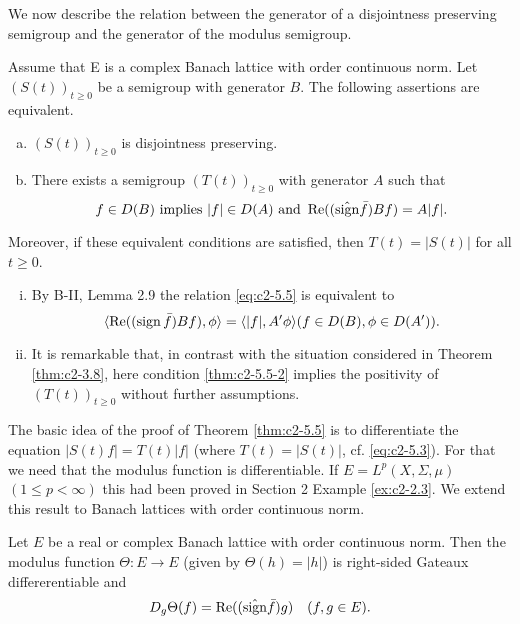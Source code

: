We now describe the relation between the generator of a disjointness preserving semigroup and the generator of the modulus semigroup.

\begin{theorem}\label{thm:c2-5.5}
Assume that E is a complex Banach lattice with order continuous norm. 
Let $(S(t))_{t \geq 0}$ be a semigroup with generator $B$.
The following assertions are equivalent.
\begin{enumerate}[(a)]
\item \label{thm:c2-5.5-1}
$(S(t))_{t \geq 0}$ is disjointness preserving.
\item \label{thm:c2-5.5-2}
There exists a semigroup $(T(t))_{t \geq 0}$ with generator $A$ such
that
\begin{equation}\label{eq:c2-5.5}
f \in D(B) \text{ implies } |f| \in D(A) \text{ and } \mathop{}\!\mathrm{Re}((\hat{\operatorname{sign}}  \bar{f})Bf) = A|f|.
\end{equation}
\end{enumerate}
Moreover, if these equivalent conditions are satisfied, then
$T(t) = |S(t)|$ for all $t \geq 0$.
\end{theorem}

\begin{remark*}
\begin{enumerate}[i)] \label{enum:c2-kgk.1}
\item  \label{enum:c2-kgk.1-1} %
By B-II, Lemma 2.9 
the relation \eqref{eq:c2-5.5} is equivalent to
\[
\langle\mathop{}\!\mathrm{Re}((\operatorname{sign}  \bar{f})Bf),\phi \rangle = \langle|f|,A'\phi\rangle  (f \in D(B), \phi \in D(A')).
\]
\item \label{enum:c2-kgk.1-2}
It is remarkable that, in contrast with the situation considered in
Theorem \ref{thm:c2-3.8}, here condition \ref{thm:c2-5.5-2}  implies the positivity of $(T(t))_{t \geq 0}$
without further assumptions.
\end{enumerate}
\end{remark*}

The basic idea of the proof of Theorem \ref{thm:c2-5.5}   is to differentiate the equation $|S(t)f| = T(t)|f|$ (where $T(t) = |S(t)|$, cf. \eqref{eq:c2-5.3}). For
that we need that the modulus function is differentiable.
If $E = L^{p}(X,\Sigma,\mu)$ $(1 \leq p < \infty)$ this had been proved in Section 2 Example 
\ref{ex:c2-2.3}.
We extend this result to Banach lattices with order continuous norm.

\begin{proposition}\label{prop:c2-5.6}
Let $E$ be a real or complex Banach lattice with order continuous norm. 
Then the modulus function $\Theta \colon E \to E$ (given by $\Theta(h) = |h|$) is right-sided Gateaux differerentiable and
\begin{equation}\label{eq:c2-5.6}
D_{g}\Theta(f) = \mathop{}\!\mathrm{Re}((\hat{\operatorname{sign}}  \bar{f})g) \quad (f, g \in E).
\end{equation}
\end{proposition}

